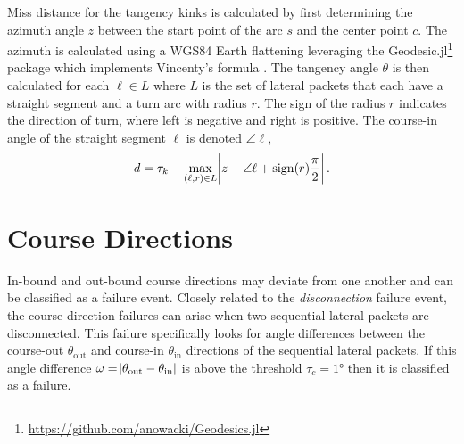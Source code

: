 Miss distance for the tangency kinks is calculated by first determining the azimuth angle $z$ between the start point of the arc $s$ and the center point $c$. The azimuth is calculated using a WGS84 Earth flattening leveraging the Geodesic.jl\footnote{\url{https://github.com/anowacki/Geodesics.jl}} package which implements Vincenty's formula  \cite{vincenty}. The tangency angle $\theta$ is then calculated for each $\ell \in L$ where $L$ is the set of lateral packets that each have a straight segment and a turn arc with radius $r$. The sign of the radius $r$ indicates the direction of turn, where left is negative and right is positive. The course-in angle of the straight segment $\ell$ is denoted $\angle \ell$,
%
% 
%
\begin{equation*}
  d = \tau_k - \max\limits_{(\ell,r) \in L} \abs{z - \angle \ell + \operatorname{sign}(r)\frac{\pi}{2}}.
\end{equation*}


\section{Course Directions}
In-bound and out-bound course directions may deviate from one another and can be classified as a failure event.
Closely related to the \textit{disconnection} failure event, the course direction failures can arise when two sequential lateral packets are disconnected. This failure specifically looks for angle differences between the course-out $\theta_{\text{out}}$ and course-in $\theta_\text{in}$ directions of the sequential lateral packets. If this angle difference $\omega = \abs{\theta_\text{out} - \theta_\text{in}}$ is above the threshold $\tau_c = 1\si{\degree}$ then it is classified as a failure.

